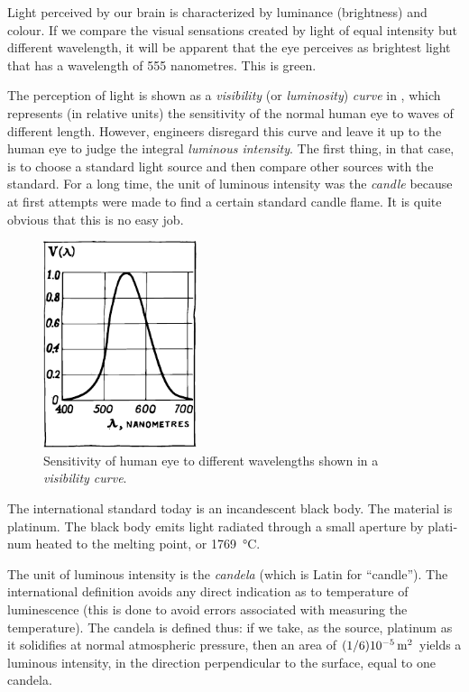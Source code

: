 Light perceived by our brain is characterized by lumi­nance (brightness) and colour. If we compare the visual sensations created by light of equal intensity but different wavelength, it will be apparent that the eye perceives as brightest light that has a wavelength of 555 nanome­tres. This is green.

The perception of light is shown as a \emph{visibility} (or \emph{luminosity}) \emph{curve} in , which represents (in relative units) the sensitivity of the normal human eye to waves of different length. However, engineers disre­gard this curve and leave it up to the human eye to judge the integral \emph{luminous intensity}. The first thing, in that case, is to choose a standard light source and then compare other sources with the standard. For a long time, the unit of luminous intensity was the \emph{candle} because at first attempts were made to find a certain standard candle flame. It is quite obvious that this is no easy job.

\begin{figure}[!ht]
\centering
\includegraphics[width=0.4\textwidth]{figures/fig-02-08.pdf}
\caption{Sensitivity of human eye to different wavelengths shown in a \emph{visibility curve}.}
\label{fig-2.8}
\end{figure}
The international standard today is an incandescent black body. The material is platinum. The black body emits light radiated through a small aperture by plati­num heated to the melting point, or \SI{1769}{\celsius}.

The unit of luminous intensity is the \emph{candela} (which is Latin for ``candle''). The international definition avoids any direct indication as to temperature of luminescence (this is done to avoid errors associated with measuring the temperature). The candela is defined thus: if we take, as the source, platinum as it solidifies at normal atmospheric pressure, then an area of $(1/6)\SI{d-5}{\meter\squared}$ yields a luminous intensity, in the direction perpendicular to the surface, equal to one candela.

